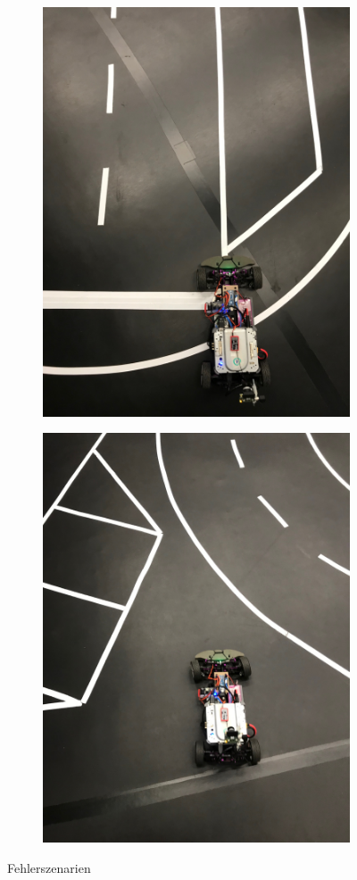 \begin{figure}[h]
	\centering
	\begin{subfigure}{.5\textwidth}
	\centering
		  \includegraphics[width=0.8\linewidth]{figures/szenario1.jpg}
	 	  \caption{}
		  \label{fig:szena}
	\end{subfigure}%
	\begin{subfigure}{.5\textwidth}
	\centering
		  \includegraphics[width=0.8\linewidth]{figures/szenario2.jpg}
	 	  \caption{}
		  \label{fig:szenb}
	\end{subfigure}%
	\caption{Fehlerszenarien}
	\label{fig:fehlerszenarien}
\end{figure}%

